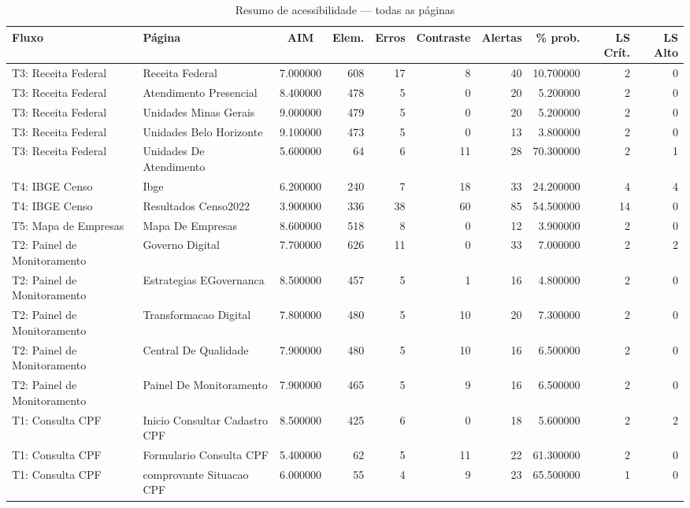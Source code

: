 \begin{table}[htbp]
  \centering
  \caption{Resumo de acessibilidade — todas as páginas}
  \label{tab:summary_all}
  \small
  \begin{tabular}{llcrrrrrr r}
\toprule
Fluxo & Página & AIM & Elem. & Erros & Contraste & Alertas & \% prob. & LS Crít. & LS Alto \\
\midrule
T3: Receita Federal & Receita Federal & 7.000000 & 608 & 17 & 8 & 40 & 10.700000 & 2 & 0 \\
T3: Receita Federal & Atendimento Presencial & 8.400000 & 478 & 5 & 0 & 20 & 5.200000 & 2 & 0 \\
T3: Receita Federal & Unidades Minas Gerais & 9.000000 & 479 & 5 & 0 & 20 & 5.200000 & 2 & 0 \\
T3: Receita Federal & Unidades Belo Horizonte & 9.100000 & 473 & 5 & 0 & 13 & 3.800000 & 2 & 0 \\
T3: Receita Federal & Unidades De Atendimento & 5.600000 & 64 & 6 & 11 & 28 & 70.300000 & 2 & 1 \\
T4: IBGE Censo & Ibge & 6.200000 & 240 & 7 & 18 & 33 & 24.200000 & 4 & 4 \\
T4: IBGE Censo & Resultados Censo2022 & 3.900000 & 336 & 38 & 60 & 85 & 54.500000 & 14 & 0 \\
T5: Mapa de Empresas & Mapa De Empresas & 8.600000 & 518 & 8 & 0 & 12 & 3.900000 & 2 & 0 \\
T2: Painel de Monitoramento & Governo Digital & 7.700000 & 626 & 11 & 0 & 33 & 7.000000 & 2 & 2 \\
T2: Painel de Monitoramento & Estrategias EGovernanca & 8.500000 & 457 & 5 & 1 & 16 & 4.800000 & 2 & 0 \\
T2: Painel de Monitoramento & Transformacao Digital & 7.800000 & 480 & 5 & 10 & 20 & 7.300000 & 2 & 0 \\
T2: Painel de Monitoramento & Central De Qualidade & 7.900000 & 480 & 5 & 10 & 16 & 6.500000 & 2 & 0 \\
T2: Painel de Monitoramento & Painel De Monitoramento & 7.900000 & 465 & 5 & 9 & 16 & 6.500000 & 2 & 0 \\
T1: Consulta CPF & Inicio Consultar Cadastro CPF & 8.500000 & 425 & 6 & 0 & 18 & 5.600000 & 2 & 2 \\
T1: Consulta CPF & Formulario Consulta CPF & 5.400000 & 62 & 5 & 11 & 22 & 61.300000 & 2 & 0 \\
T1: Consulta CPF & comprovante Situacao CPF & 6.000000 & 55 & 4 & 9 & 23 & 65.500000 & 1 & 0 \\
\bottomrule
\end{tabular}
\end{table}
